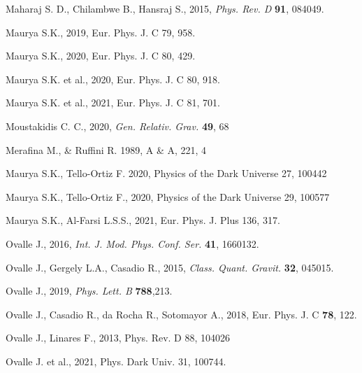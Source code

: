 \documentclass[]{aastex631}
\begin{document}
\begin{thebibliography}{99}
  Maharaj S. D.,  Chilambwe B.,  Hansraj S.,  2015, {\em Phys. Rev. D} {\bf 91},  084049.

 Maurya S.K., 2019, Eur. Phys. J. C 79, 958.

 Maurya S.K., 2020, Eur. Phys. J. C 80, 429.

 Maurya S.K. et al., 2020, Eur. Phys. J. C 80, 918. 

 Maurya S.K. et al., 2021, Eur. Phys. J. C 81, 701.

  Moustakidis C. C., 2020, {\em Gen. Relativ. Grav.} {\bf 49}, 68

 Merafina M., \& Ruffini R. 1989, A \& A, 221, 4 

 Maurya S.K., Tello-Ortiz F.  2020, Physics of the Dark Universe 27, 100442

 Maurya S.K., Tello-Ortiz F.,  2020, Physics of the Dark Universe 29, 100577

 Maurya S.K., Al-Farsi L.S.S.,  2021, Eur. Phys. J. Plus 136, 317.

   Ovalle J., 2016, {\em Int. J. Mod. Phys. Conf. Ser.} {\bf 41}, 1660132.

  Ovalle J., Gergely L.A., Casadio R.,  2015, {\em  Class. Quant. Gravit.} {\bf 32}, 045015.

  Ovalle J.,  2019, {\em Phys. Lett. B} {\bf  788},213. 

  Ovalle J.,  Casadio R., da Rocha R.,  Sotomayor A.,  2018, Eur. Phys. J. C {\bf78}, 122.

 Ovalle J., Linares F.,  2013, Phys. Rev. D 88, 104026

  Ovalle J. et al., 2021, Phys. Dark Univ. 31, 100744.


\end{thebibliography}
\end{document}
